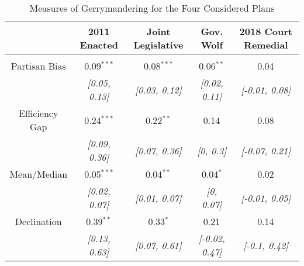 \begin{table}[!htbp] \centering 
  \caption{Measures of Gerrymandering for the Four Considered Plans} 
  \label{tab:gerry} 
\begin{tabular}{@{\extracolsep{-5pt}} ccccc} 
 & 2011 Enacted & Joint Legislative & Gov. Wolf & 2018 Court Remedial \\ 
\hline \\[-1.8ex] 
Partisan Bias & 0.09$^{***}$ & 0.08$^{***}$ & 0.06$^{**}$ & 0.04$^{}$ \\ 
 & {\small\textit{[0.05, 0.13]}} & {\small\textit{[0.03, 0.12]}} & {\small\textit{[0.02, 0.11]}} & {\small\textit{[-0.01, 0.08]}} \\ 
Efficiency Gap & 0.24$^{***}$ & 0.22$^{**}$ & 0.14$^{}$ & 0.08$^{}$ \\ 
 & {\small\textit{[0.09, 0.36]}} & {\small\textit{[0.07, 0.36]}} & {\small\textit{[0, 0.3]}} & {\small\textit{[-0.07, 0.21]}} \\ 
Mean/Median & 0.05$^{***}$ & 0.04$^{**}$ & 0.04$^{*}$ & 0.02$^{}$ \\ 
 & {\small\textit{[0.02, 0.07]}} & {\small\textit{[0.01, 0.07]}} & {\small\textit{[0, 0.07]}} & {\small\textit{[-0.01, 0.05]}} \\ 
Declination & 0.39$^{**}$ & 0.33$^{*}$ & 0.21$^{}$ & 0.14$^{}$ \\ 
 & {\small\textit{[0.13, 0.63]}} & {\small\textit{[0.07, 0.61]}} & {\small\textit{[-0.02, 0.47]}} & {\small\textit{[-0.1, 0.42]}} \\ 
\end{tabular}
\end{table}
